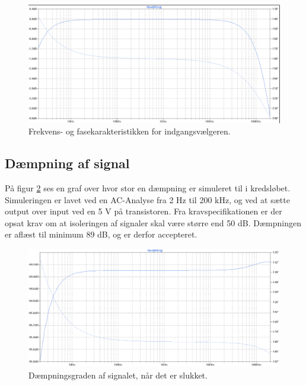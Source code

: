 \begin{figure}[h]
\centering
\includegraphics[scale=0.3]{teknisk/indgangsvaelger/simulering/frekvenskarakteristik.png}
\caption{Frekvens- og fasekarakteristikken for indgangsvælgeren.}
\label{indgangsvaelger_frekvenskarakteristik}
\end{figure}

\subsection*{Dæmpning af signal}
På figur \ref{indgangsvaelger_daempniing} ses en graf over hvor stor en dæmpning er simuleret til i kredsløbet. Simuleringen er lavet ved en AC-Analyse fra 2 Hz til 200 kHz, og ved at sætte output over input ved en 5 V på transistoren. Fra kravspecifikationen er der opsat krav om at isoleringen af signaler skal være større end 50 dB. Dæmpningen er aflæst til minimum 89 dB, og er derfor accepteret.
\begin{figure}[h]
\centering
\includegraphics[scale=0.3]{teknisk/indgangsvaelger/simulering/daempning_af_signal.png}
\caption{Dæmpningsgraden af signalet, når det er slukket.}
\label{indgangsvaelger_daempniing}
\end{figure}

